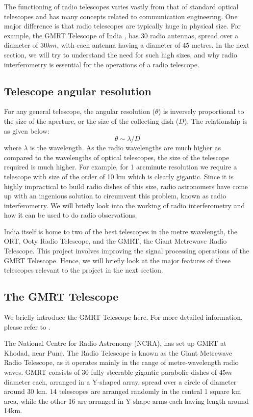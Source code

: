 The functioning of radio telescopes varies vastly from that of standard optical telescopes and has many concepts 
related to communication engineering. One major difference is that radio telescopes are typically huge in physical size.
For example, the GMRT Telescope of India \cite{GMRT}, has $30$ radio antennas, spread over a diameter of $30km$, with each antenna having a diameter of $45$ metres.
In the next section, we will try to understand the need for such high sizes, and why radio interferometry is essential for the operations of a radio telescope.


\subsection*{Telescope angular resolution}
For any general telescope, the angular resolution ($\theta$)  is inversely proportional to the 
size of the aperture, or the size of the collecting dish ($D$). The relationship is as 
given below:
\begin{equation}
 \theta \sim \lambda/D
\end{equation}
where $\lambda$ is the wavelength.
As the radio wavelengths are much higher as compared to the wavelengths of optical telescopes, 
the size of the telescope required is much higher.
For example, for 1 arcminute resolution we require a telescope with size of the order of 10 km which is clearly gigantic.
Since it is highly impractical to build radio dishes of this size, radio astronomers have come up with an ingenious solution to circumvent this problem, known
as radio interferometry. We will briefly look into the working of radio interferometry and 
how it can be used to do radio observations. 


India itself is home to two of the best telescopes in the metre wavelength,
the ORT, Ooty Radio Telescope, and the GMRT, the Giant Metrewave Radio Telescope.
This project involves improving the signal processing operations of the GMRT Telescope.
Hence, we will briefly look at the major features of these telescopes relevant to the project in the next section.


\subsection{The GMRT Telescope}

We briefly introduce the GMRT Telescope here. For more detailed information, please refer to \cite{GMRT,ncra_book}.

The National Centre for Radio Astronomy (NCRA), has set up GMRT at Khodad, near Pune.
The Radio Telescope is known as the Giant Metrewave Radio Telescope, as it operates mainly in the range of metre-wavelength 
radio waves. GMRT consists of 30 fully steerable gigantic parabolic dishes of $45m$ diameter each, arranged in a Y-shaped array, 
spread over a circle of diameter around 30 km. $14$ telescopes are arranged randomly in the central 1 square km area, while the other 
16 are arranged in Y-shape arms each having length around 14km. 

